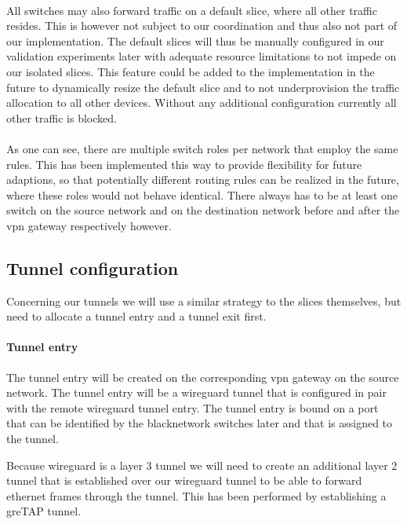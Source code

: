\paragraph{} All switches may also forward traffic on a default slice, where all other traffic resides. This is however not subject to our coordination and thus also not part of our implementation. The default slices will thus be manually configured in our validation experiments later with adequate resource limitations to not impede on our isolated slices. This feature could be added to the implementation in the future to dynamically resize the default slice and to not underprovision the traffic allocation to all other devices. Without any additional configuration currently all other traffic is blocked.

\paragraph{} As one can see, there are multiple switch roles per network that employ the same rules. This has been implemented this way to provide flexibility for future adaptions, so that potentially different routing rules can be realized in the future, where these roles would not behave identical. There always has to be at least one switch on the source network and on the destination network before and after the \acrshort{vpn} gateway respectively however.

\subsection{Tunnel configuration}
\label{impl_tunnel_config}
Concerning our tunnels we will use a similar strategy to the slices themselves, but need to allocate a tunnel entry and a tunnel exit first.

\paragraph{Tunnel entry} The tunnel entry will be created on the corresponding \acrshort{vpn} gateway on the source network. The tunnel entry will be a \gls{wireguard} tunnel that is configured in pair with the remote \gls{wireguard} tunnel entry. The tunnel entry is bound on a port that can be identified by the \gls{blacknetwork} switches later and that is assigned to the tunnel.

Because \gls{wireguard} is a layer 3 tunnel we will need to create an additional layer 2 tunnel that is established over our \gls{wireguard} tunnel to be able to forward ethernet frames through the tunnel. This has been performed by establishing a \acrshort{gre}TAP tunnel.


